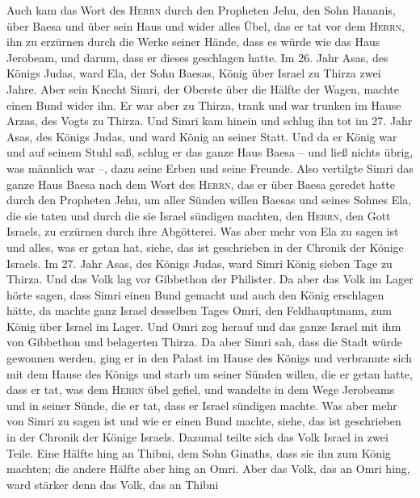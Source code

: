  Auch kam das Wort des \textsc{Herrn} durch den Propheten
Jehu, den Sohn Hananis, über Baesa und über sein Haus und wider alles
Übel, das er tat vor dem \textsc{Herrn}, ihn zu erzürnen durch die Werke
seiner Hände, dass es würde wie das Haus Jerobeam, und darum, dass er
dieses geschlagen hatte.  Im 26. Jahr Asas, des Königs
Judas, ward Ela, der Sohn Baesas, König über Israel zu Thirza zwei
Jahre.  Aber sein Knecht Simri, der Oberste über die
Hälfte der Wagen, machte einen Bund wider ihn. Er war aber zu Thirza,
trank und war trunken im Hause Arzas, des Vogts zu Thirza.
 Und Simri kam hinein und schlug ihn tot im 27. Jahr
Asas, des Königs Judas, und ward König an seiner Statt. 
Und da er König war und auf seinem Stuhl saß, schlug er das ganze Haus
Baesa -- und ließ nichts übrig, was männlich war --, dazu seine Erben
und seine Freunde.  Also vertilgte Simri das ganze Haus
Baesa nach dem Wort des \textsc{Herrn}, das er über Baesa geredet hatte
durch den Propheten Jehu,  um aller Sünden willen Baesas
und seines Sohnes Ela, die sie taten und durch die sie Israel sündigen
machten, den \textsc{Herrn}, den Gott Israels, zu erzürnen durch ihre
Abgötterei.  Was aber mehr von Ela zu sagen ist und
alles, was er getan hat, siehe, das ist geschrieben in der Chronik der
Könige Israels.  Im 27. Jahr Asas, des Königs Judas, ward
Simri König sieben Tage zu Thirza. Und das Volk lag vor Gibbethon der
Philister.  Da aber das Volk im Lager hörte sagen, dass
Simri einen Bund gemacht und auch den König erschlagen hätte, da machte
ganz Israel desselben Tages Omri, den Feldhauptmann, zum König über
Israel im Lager.  Und Omri zog herauf und das ganze
Israel mit ihm von Gibbethon und belagerten Thirza.  Da
aber Simri sah, dass die Stadt würde gewonnen werden, ging er in den
Palast im Hause des Königs und verbrannte sich mit dem Hause des Königs
und starb  um seiner Sünden willen, die er getan hatte,
dass er tat, was dem \textsc{Herrn} übel gefiel, und wandelte in dem
Wege Jerobeams und in seiner Sünde, die er tat, dass er Israel sündigen
machte.  Was aber mehr von Simri zu sagen ist und wie er
einen Bund machte, siehe, das ist geschrieben in der Chronik der Könige
Israels.  Dazumal teilte sich das Volk Israel in zwei
Teile. Eine Hälfte hing an Thibni, dem Sohn Ginaths, dass sie ihn zum
König machten; die andere Hälfte aber hing an Omri.  Aber
das Volk, das an Omri hing, ward stärker denn das Volk, das an Thibni
